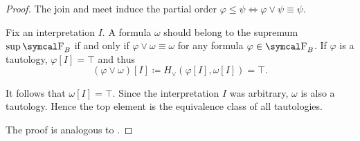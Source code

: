 \begin{proof}
  The join and meet induce the partial order \( \varphi \leq \psi \iff \varphi \vee \psi \equiv \psi \).

   Fix an interpretation \( I \). A formula \( \omega \) should belong to the supremum \( \sup \CF_B \) if and only if \( \varphi \vee \omega \equiv \omega \) for any formula \( \varphi \in \CF_B \). If \( \varphi \) is a tautology, \( \varphi[I] = \top \) and thus
  \begin{equation*}
    (\varphi \vee \omega)[I] \coloneqq H_\vee(\varphi[I], \omega[I]) = \top.
  \end{equation*}

  It follows that \( \omega[I] = \top \). Since the interpretation \( I \) was arbitrary, \( \omega \) is also a tautology. Hence the top element is the equivalence class of all tautologies.

   The proof is analogous to .
\end{proof}

